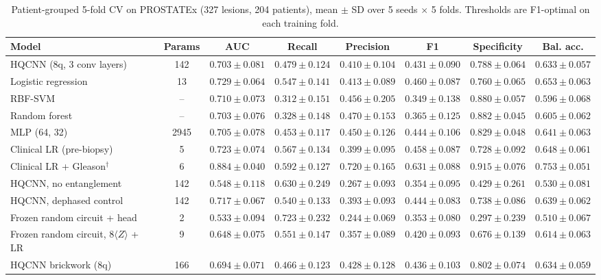 \begin{table}[t]
\centering
\caption{Patient-grouped 5-fold CV on PROSTATEx (327 lesions, 204 patients), mean $\pm$ SD over 5 seeds $\times$ 5 folds. Thresholds are F1-optimal on each training fold.}
\label{tab:v3_cv}
\small
\begin{tabular}{lccccccc}
\toprule
Model & Params & AUC & Recall & Precision & F1 & Specificity & Bal. acc. \\
\midrule
HQCNN (8q, 3 conv layers) & 142 & $0.703 \pm 0.081$ & $0.479 \pm 0.124$ & $0.410 \pm 0.104$ & $0.431 \pm 0.090$ & $0.788 \pm 0.064$ & $0.633 \pm 0.057$ \\
Logistic regression & 13 & $0.729 \pm 0.064$ & $0.547 \pm 0.141$ & $0.413 \pm 0.089$ & $0.460 \pm 0.087$ & $0.760 \pm 0.065$ & $0.653 \pm 0.063$ \\
RBF-SVM & -- & $0.710 \pm 0.073$ & $0.312 \pm 0.151$ & $0.456 \pm 0.205$ & $0.349 \pm 0.138$ & $0.880 \pm 0.057$ & $0.596 \pm 0.068$ \\
Random forest & -- & $0.703 \pm 0.076$ & $0.328 \pm 0.148$ & $0.470 \pm 0.153$ & $0.365 \pm 0.125$ & $0.882 \pm 0.045$ & $0.605 \pm 0.062$ \\
MLP (64, 32) & 2945 & $0.705 \pm 0.078$ & $0.453 \pm 0.117$ & $0.450 \pm 0.126$ & $0.444 \pm 0.106$ & $0.829 \pm 0.048$ & $0.641 \pm 0.063$ \\
Clinical LR (pre-biopsy) & 5 & $0.723 \pm 0.074$ & $0.567 \pm 0.134$ & $0.399 \pm 0.095$ & $0.458 \pm 0.087$ & $0.728 \pm 0.092$ & $0.648 \pm 0.061$ \\
Clinical LR + Gleason$^{\dagger}$ & 6 & $0.884 \pm 0.040$ & $0.592 \pm 0.127$ & $0.720 \pm 0.165$ & $0.631 \pm 0.088$ & $0.915 \pm 0.076$ & $0.753 \pm 0.051$ \\
HQCNN, no entanglement & 142 & $0.548 \pm 0.118$ & $0.630 \pm 0.249$ & $0.267 \pm 0.093$ & $0.354 \pm 0.095$ & $0.429 \pm 0.261$ & $0.530 \pm 0.081$ \\
HQCNN, dephased control & 142 & $0.717 \pm 0.067$ & $0.540 \pm 0.133$ & $0.393 \pm 0.093$ & $0.444 \pm 0.083$ & $0.738 \pm 0.086$ & $0.639 \pm 0.062$ \\
Frozen random circuit + head & 2 & $0.533 \pm 0.094$ & $0.723 \pm 0.232$ & $0.244 \pm 0.069$ & $0.353 \pm 0.080$ & $0.297 \pm 0.239$ & $0.510 \pm 0.067$ \\
Frozen random circuit, 8$\langle Z\rangle$ + LR & 9 & $0.648 \pm 0.075$ & $0.551 \pm 0.147$ & $0.357 \pm 0.089$ & $0.420 \pm 0.093$ & $0.676 \pm 0.139$ & $0.614 \pm 0.063$ \\
HQCNN brickwork (8q) & 166 & $0.694 \pm 0.071$ & $0.466 \pm 0.123$ & $0.428 \pm 0.128$ & $0.436 \pm 0.103$ & $0.802 \pm 0.074$ & $0.634 \pm 0.059$ \\

\end{tabular}
\end{table}
